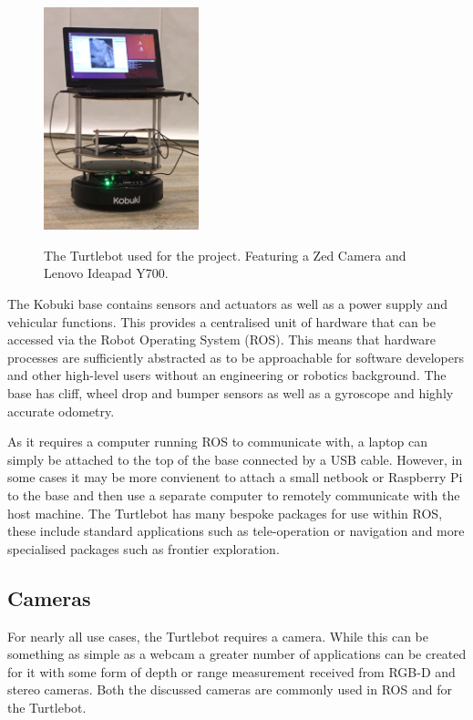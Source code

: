 \documentclass{mproj}
\begin{document}
\begin{figure}[h]
  \caption{The Turtlebot used for the project. Featuring a Zed Camera and Lenovo Ideapad Y700.}
  \centering
  \includegraphics[width=0.4\textwidth]{images/turtlebot.JPG}
  \label{fig:Turtlebot}
\end{figure}
 
The Kobuki base contains sensors and actuators as well as a power supply and vehicular functions. This provides a centralised unit of hardware that can be accessed via the Robot Operating System (ROS). This means that hardware processes are sufficiently abstracted as to be approachable for software developers and other high-level users without an engineering or robotics background. The base has cliff, wheel drop and bumper sensors as well as a gyroscope and highly accurate odometry. 

As it requires a computer running ROS to communicate with, a laptop can simply be attached to the top of the base connected by a USB cable. However, in some cases it may be more convienent to attach a small netbook or Raspberry Pi to the base and then use a separate computer to remotely communicate with the host machine. The Turtlebot has many bespoke packages for use within ROS, these include standard applications such as tele-operation or navigation and more specialised packages such as frontier exploration. 


\subsection{Cameras}
For nearly all use cases, the Turtlebot requires a camera. While this can be something as simple as a webcam a greater number of applications can be created for it with some form of depth or range measurement received from RGB-D and stereo cameras. Both the discussed cameras are commonly used in ROS and for the Turtlebot.
\end{document}
